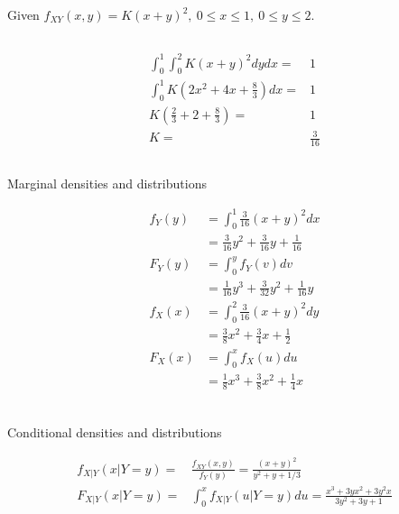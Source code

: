 \documentclass{article}
\begin{document}
Given $f_{XY}(x, y) = K(x+y)^2,\ 0\le x\le 1,\ 0\le y\le 2$.

\subsection{}
\begin{align*}
    \int_0^1 \int_0^2 K(x+y)^2 d y d x = & 1\\
    \int_0^1 K\left(2 x^2+4 x+\frac{8}{3}\right) d x = & 1\\
    K\left(\frac{2}{3}+2+\frac{8}{3}\right)= & 1\\
    K = & \frac{3}{16}
\end{align*}

\subsection{}
Marginal densities and distributions

\begin{align*}
    f_Y(y) &=\int_0^1 \frac{3}{16}(x+y)^2 d x \\
    &=\frac{3}{16} y^2+\frac{3}{16} y+\frac{1}{16} \\
    F_Y(y) &= \int^y_{0}f_Y(v)dv\\
    &= \frac{1}{16}y^3+\frac{3}{32}y^2+\frac{1}{16}y\\
    f_X(x) &=\int_0^2 \frac{3}{16}(x+y)^2 d y \\
    &=\frac{3}{8} x^2+\frac{3}{4} x+\frac{1}{2}\\
    F_X(x) &= \int^x_{0}f_X(u)du\\
    &= \frac{1}{8}x^3+\frac{3}{8}x^2+\frac{1}{4}x\\
\end{align*}
\subsection{}
Conditional densities and distributions

\begin{align*}
    f_{X|Y}(x|Y=y) =& \frac{f_{XY}(x, y)}{f_Y(y)} = \frac{(x+y)^2}{y^2+y+1/3}\\
    F_{X|Y}(x|Y=y) =& \int_0^x f_{X|Y}(u|Y=y)du = \frac{ x^3 + 3yx^2 + 3y^2x}{3y^2 + 3y + 1}
\end{align*}


\section{}
\end{document}
